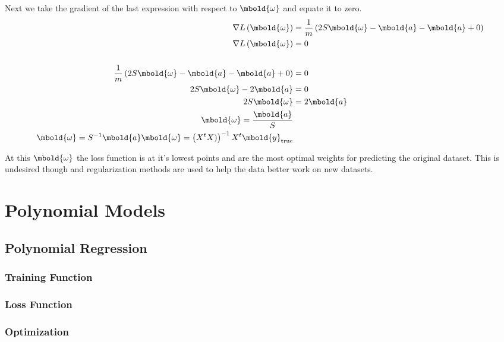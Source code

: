 \documentclass[12pt letter]{report}
\begin{document}
Next we take the gradient of the last expression with respect to $\mbold{\omega}$ and equate it to zero.
\begin{align*}
  \nabla L \left( \mbold{\omega} \right)                                   & = \frac{1}{m} \left( 2S \mbold{\omega} -
  \mbold{a} - \mbold{a} + 0 \right)                                                                                   \\
  \nabla L \left( \mbold{\omega} \right)                                   & = 0                                      \\
  \\
  \frac{1}{m} \left( 2S \mbold{\omega} - \mbold{a} - \mbold{a} + 0 \right) & = 0                                      \\
  2 S \mbold{\omega} -2 \mbold{a}                                          & = 0                                      \\
  2 S \mbold{\omega}                                                       & = 2 \mbold{a}                            \\
  \mbold{\omega} = \frac{\mbold{a}}{S}                                                                                \\
  \mbold{\omega} = S^{-1}\mbold{a}
  \mbold{\omega} = \left( X^t X ) \right)^{-1} X^t \mbold{y}_{\text{true}}
\end{align*}

At this $\mbold{\omega}$ the loss function is at it's lowest points and are the most optimal weights for predicting the
original dataset. This is undesired though and regularization methods are used to help the data better work on new
datasets.


\chapter{Polynomial Models}

\section{Polynomial Regression}
\subsection{Training Function}
\subsection{Loss Function}
\subsection{Optimization}
\end{document}
